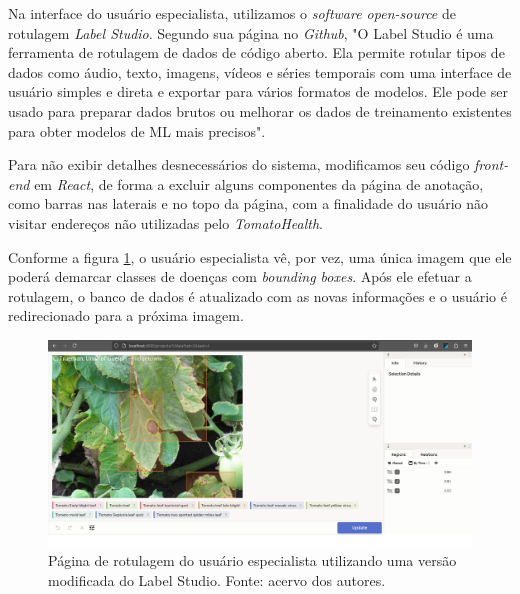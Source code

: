 Na interface do usuário especialista, utilizamos o \textit{software open-source} de rotulagem \emph{Label Studio}. Segundo sua página no \emph{Github}, "O Label Studio é uma ferramenta de rotulagem de dados de código aberto. Ela permite rotular tipos de dados como áudio, texto, imagens, vídeos e séries temporais com uma interface de usuário simples e direta e exportar para vários formatos de modelos. Ele pode ser usado para preparar dados brutos ou melhorar os dados de treinamento existentes para obter modelos de ML mais precisos".

Para não exibir detalhes desnecessários do sistema, modificamos seu código \textit{front-end} em \emph{React}, de forma a excluir alguns componentes da página de anotação, como barras nas laterais e no topo da página, com a finalidade do usuário não visitar endereços não utilizadas pelo \emph{TomatoHealth}.

Conforme a figura \ref{fig:rotulagem_labelstudio}, o usuário especialista vê, por vez, uma única imagem que ele poderá demarcar classes de doenças com \textit{bounding boxes}. Após ele efetuar a rotulagem, o banco de dados é atualizado com as novas informações e o usuário é redirecionado para a próxima imagem.

\begin{figure}[htbp]
    \centering
    \includegraphics[width=1\linewidth]{images/rotulagem_labelstudio.jpg}
    \caption{\label{fig:rotulagem_labelstudio} Página de rotulagem do usuário especialista utilizando uma versão modificada do Label Studio. Fonte: acervo dos autores.}
\end{figure}